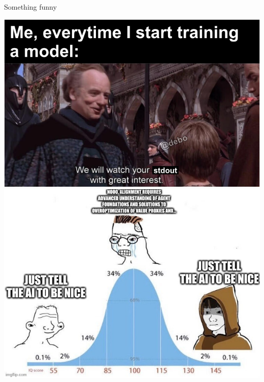 \documentclass{beamer}
\begin{document}
\begin{frame}{Something funny}

\includegraphics[width=0.5\linewidth]{assets/meme1.png}
\includegraphics[width=0.5\linewidth]{assets/meme2.jpg}

\end{frame}
\end{document}
